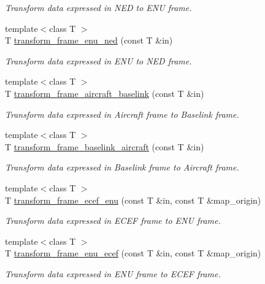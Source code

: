 \begin{DoxyCompactItemize}
\begin{DoxyCompactList}\small\item\em Transform data expressed in N\+ED to E\+NU frame. \end{DoxyCompactList}\item 
{\footnotesize template$<$class T $>$ }\\T \mbox{\hyperlink{group__nodelib_ga789377f76104cb6f7665ad368dbba1c9}{transform\+\_\+frame\+\_\+enu\+\_\+ned}} (const T \&in)
\begin{DoxyCompactList}\small\item\em Transform data expressed in E\+NU to N\+ED frame. \end{DoxyCompactList}\item 
{\footnotesize template$<$class T $>$ }\\T \mbox{\hyperlink{group__nodelib_gad724ac71858730a830ae77b9dd480aaf}{transform\+\_\+frame\+\_\+aircraft\+\_\+baselink}} (const T \&in)
\begin{DoxyCompactList}\small\item\em Transform data expressed in Aircraft frame to Baselink frame. \end{DoxyCompactList}\item 
{\footnotesize template$<$class T $>$ }\\T \mbox{\hyperlink{group__nodelib_ga8e8a38a1f75dd0007204a206a6745193}{transform\+\_\+frame\+\_\+baselink\+\_\+aircraft}} (const T \&in)
\begin{DoxyCompactList}\small\item\em Transform data expressed in Baselink frame to Aircraft frame. \end{DoxyCompactList}\item 
{\footnotesize template$<$class T $>$ }\\T \mbox{\hyperlink{group__nodelib_gaa1d1407cbddfd1481e147680e92acab8}{transform\+\_\+frame\+\_\+ecef\+\_\+enu}} (const T \&in, const T \&map\+\_\+origin)
\begin{DoxyCompactList}\small\item\em Transform data expressed in E\+C\+EF frame to E\+NU frame. \end{DoxyCompactList}\item 
{\footnotesize template$<$class T $>$ }\\T \mbox{\hyperlink{group__nodelib_ga8f46c9063053398c558624755757f1e2}{transform\+\_\+frame\+\_\+enu\+\_\+ecef}} (const T \&in, const T \&map\+\_\+origin)
\begin{DoxyCompactList}\small\item\em Transform data expressed in E\+NU frame to E\+C\+EF frame. \end{DoxyCompactList}\item 

\end{DoxyCompactItemize}
